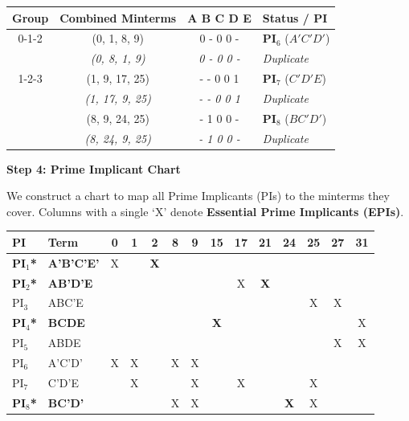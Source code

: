 \documentclass[12pt,a3paper]{article}
\begin{document}
\begin{enumerate}
\begin{tcolorbox}[enhanced,breakable,ansbox,colback=cC!4,colframe=cC,boxrule=0.8pt,arc=5pt,title={\textbf{Answer}},fonttitle=\bfseries\color{white},colbacktitle=cC]
\begin{center}
\begin{tabular}{cccl}
\toprule
\textbf{Group} & \textbf{Combined Minterms} & \textbf{A B C D E} & \textbf{Status / PI} \\
\midrule
0-1-2 & (0, 1, 8, 9)   & 0 - 0 0 - & \textcolor{cC}{\textbf{PI$_6$}} ($A'C'D'$) \\
      & \textit{(0, 8, 1, 9)}   & \textit{0 - 0 0 -} & \textit{Duplicate} \\
\midrule
1-2-3 & (1, 9, 17, 25) & - - 0 0 1 & \textcolor{cC}{\textbf{PI$_7$}} ($C'D'E$) \\
      & \textit{(1, 17, 9, 25)} & \textit{- - 0 0 1} & \textit{Duplicate} \\
      & (8, 9, 24, 25) & - 1 0 0 - & \textcolor{cC}{\textbf{PI$_8$}} ($BC'D'$) \\
      & \textit{(8, 24, 9, 25)} & \textit{- 1 0 0 -} & \textit{Duplicate} \\
\bottomrule
\end{tabular}
\end{center}

\vspace{1em}
\textbf{\large Step 4: Prime Implicant Chart}

We construct a chart to map all Prime Implicants (PIs) to the minterms they cover. Columns with a single `X' denote \textbf{Essential Prime Implicants (EPIs)}.

\begin{center}
\setlength{\tabcolsep}{3.5pt} %
\renewcommand{\arraystretch}{1.2}
\begin{tabular}{llcccccccccccc}
\toprule
\textbf{PI} & \textbf{Term} & \textbf{0} & \textbf{1} & \textbf{2} & \textbf{8} & \textbf{9} & \textbf{15} & \textbf{17} & \textbf{21} & \textbf{24} & \textbf{25} & \textbf{27} & \textbf{31} \\
\midrule
\rowcolor{cC!10}
\textbf{PI$_1$*} & \textbf{A'B'C'E'} & X & & \textbf{X} & & & & & & & & & \\
\rowcolor{cC!10}
\textbf{PI$_2$*} & \textbf{AB'D'E}   & & & & & & & X & \textbf{X} & & & & \\
PI$_3$ & ABC'E     & & & & & & & & & & X & X & \\
\rowcolor{cC!10}
\textbf{PI$_4$*} & \textbf{BCDE}     & & & & & & \textbf{X} & & & & & & X \\
PI$_5$ & ABDE      & & & & & & & & & & & X & X \\
PI$_6$ & A'C'D'    & X & X & & X & X & & & & & & & \\
PI$_7$ & C'D'E     & & X & & & X & & X & & & X & & \\
\rowcolor{cC!10}
\textbf{PI$_8$*} & \textbf{BC'D'}    & & & & X & X & & & & \textbf{X} & X & & \\
\bottomrule
\end{tabular}
\end{center}


\end{tcolorbox}
\end{enumerate}
\end{document}
